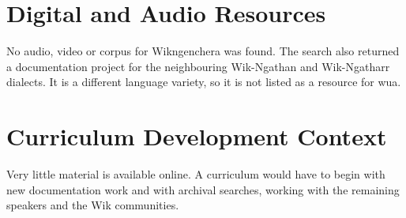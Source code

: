 \documentclass[12pt]{article}
\begin{document}
\section{Digital and Audio Resources}
No audio, video or corpus for Wikngenchera was found. The search also returned a documentation project for the neighbouring Wik-Ngathan and Wik-Ngatharr dialects. It is a different language variety, so it is not listed as a resource for wua.

\section{Curriculum Development Context}
Very little material is available online. A curriculum would have to begin with new documentation work and with archival searches, working with the remaining speakers and the Wik communities.
\end{document}
